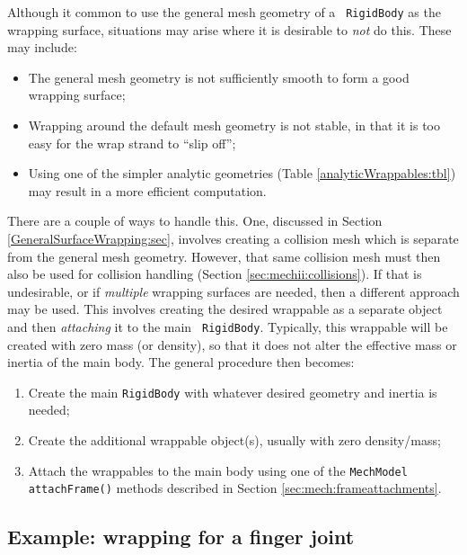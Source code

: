 Although it common to use the general mesh geometry of a {\tt
RigidBody} as the wrapping surface, situations may arise where it is
desirable to {\it not} do this. These may include:

\begin{itemize}

\item The general mesh geometry is not sufficiently smooth
to form a good wrapping surface;

\item Wrapping around the default mesh geometry is not stable, in
that it is too easy for the wrap strand to ``slip off'';

\item Using one of the simpler analytic geometries
(Table \ref{analyticWrappables:tbl}) may result in a more efficient
computation.

\end{itemize}

There are a couple of ways to handle this. One, discussed in Section
\ref{GeneralSurfaceWrapping:sec}, involves creating a collision mesh
which is separate from the general mesh geometry. However, that same
collision mesh must then also be used for collision handling (Section
\ref{sec:mechii:collisions}). If that is undesirable, or if {\it
multiple} wrapping surfaces are needed, then a different approach may
be used. This involves creating the desired wrappable as a separate
object and then {\it attaching} it to the main {\tt
RigidBody}. Typically, this wrappable will be created with zero mass
(or density), so that it does not alter the effective mass or inertia
of the main body. The general procedure then becomes:

\begin{enumerate}

\item Create the main {\tt RigidBody} with whatever desired geometry
and inertia is needed;

\item Create the additional wrappable object(s), usually
with zero density/mass;

\item Attach the wrappables to the main body using
one of the {\tt MechModel} {\tt attachFrame()} methods described in
Section \ref{sec:mech:frameattachments}.

\end{enumerate}

\subsection{Example: wrapping for a finger joint}
\label{PhalanxWrapping:sec}


